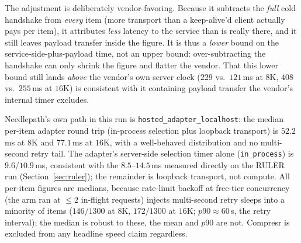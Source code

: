 \documentclass[11pt]{article}
\newcommand{\NP}{Needlepath}
\begin{document}
The adjustment is deliberately vendor-favoring. Because it subtracts the \emph{full} cold handshake
from \emph{every} item (more transport than a keep-alive'd client actually pays per item), it
attributes \emph{less} latency to the service than is really there, and it still leaves payload
transfer inside the figure. It is thus a \emph{lower} bound on the service-side-plus-payload time,
not an upper bound: over-subtracting the handshake can only shrink the figure and flatter the
vendor. That this lower bound still lands \emph{above} the vendor's own server clock ($229$ vs.\
$121$\,ms at $8$K, $408$ vs.\ $255$\,ms at $16$K) is consistent with it containing payload transfer
the vendor's internal timer excludes.

\NP{}'s own path in this run is \texttt{hosted\_adapter\_localhost}: the median per-item adapter
round trip (in-process selection plus loopback transport) is $52.2$\,ms at $8$K and $77.1$\,ms at
$16$K, with a well-behaved distribution and no multi-second retry tail. The adapter's server-side
selection timer alone (\texttt{in\_process}) is $9.6$/$10.9$\,ms, consistent with the
$8.5$--$14.5$\,ms measured directly on the RULER run (Section~\ref{sec:ruler}); the remainder is
loopback transport, not compute. All per-item figures
are medians, because rate-limit backoff at free-tier concurrency (the arm ran at $\le 2$ in-flight
requests) injects multi-second retry sleeps into a minority of items ($146/1300$ at $8$K,
$172/1300$ at $16$K; $p90 \approx 60$\,s, the retry interval); the median is robust to these, the
mean and $p90$ are not. Compresr is excluded from any headline speed claim regardless.
\end{document}
